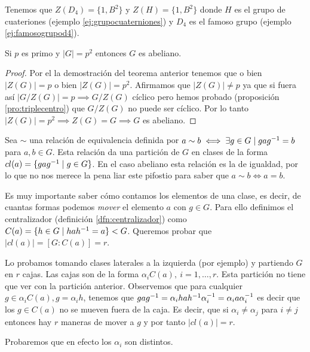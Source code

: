 \begin{ej}
	Tenemos que $Z(D_4) = \{1,B^2\}$ y $Z(H) = \{1, B^2\}$ donde $H$ es el grupo de cuateriones (ejemplo \ref{ej:grupocuaterniones}) y $D_4$ es el famoso grupo (ejemplo \ref{ej:famosogrupod4}). 
\end{ej}

\begin{thm}
	Si $p$ es primo y $|G| = p^2$ entonces $G$ es abeliano.
\end{thm}

\begin{proof}
	Por el la demostración del teorema anterior tenemos que o bien $|Z(G)| = p$ o bien $|Z(G)| = p^2$. Afirmamos que $|Z(G)| \neq p$ ya que si fuera así $|G/Z(G)| = p \implies G/Z(G)$ cíclico pero hemos probado (proposición \ref{pro:triplecentro}) que $G/Z(G)$ no puede ser cíclico. Por lo tanto $|Z(G)| = p^2 \implies Z(G) = G \implies G$ es abeliano.
\end{proof}


\hr

Sea $\sim$ una relación de equivalencia definida por $a\sim b \iff \exists g \in G \mid gag^{-1} = b$ para $a,b \in G$. Esta relación da una partición de $G$ en clases de la forma $cl(a) = \{gag^{-1} \mid g \in G\}$. En el caso abeliano esta relación es la de igualdad, por lo que no nos merece la pena liar este pifostio para saber que $a\sim b \iff a = b$. 

Es muy importante saber cómo contamos los elementos de una clase, es decir, de cuantas formas podemos \textit{mover} el elemento $a$ con $g \in G$. Para ello definimos el centralizador (definición \ref{dfn:centralizador}) como $C(a) = \{h \in G \mid hah^{-1} = a\} < G$. Queremos probar que $|cl(a)| = [G:C(a)] = r$.

Lo probamos tomando clases laterales a la izquierda (por ejemplo) y partiendo $G$ en $r$ cajas. Las cajas son de la forma $\alpha_iC(a),\ i = 1, \dots, r$. Esta partición no tiene que ver con la partición anterior. Observemos que para cualquier $g \in \alpha_i C(a), g = \alpha_i h$, tenemos que $g a g^{-1} = \alpha_i h a h^{-1} \alpha_i^{-1} = \alpha_i a \alpha_i^{-1}$ es decir que los $g \in C(a)$ no se mueven fuera de la caja. Es decir, que si $\alpha_i \neq \alpha_j$ para $i\neq j$ entonces hay $r$ maneras de mover a $g$ y por tanto $|cl(a)| = r$.

Probaremos que en efecto los $\alpha_i$ son distintos.

